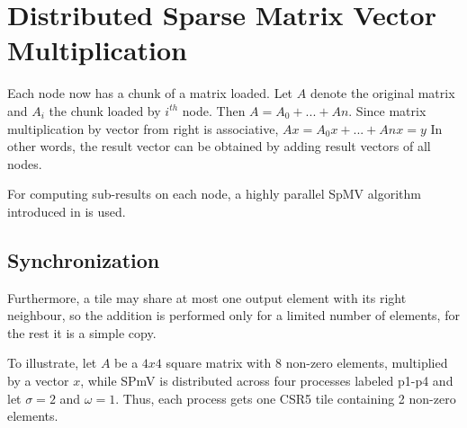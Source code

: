 \documentclass[thesis=M,english]{FITthesis}[2019/12/23]
\begin{document}
\chapter{Distributed Sparse Matrix Vector Multiplication}

Each node now has a chunk of a matrix loaded. Let $A$ denote the original matrix
and $A_{i}$ the chunk loaded by $i^{th}$ node. Then $A = A_{0} + ... + A{n}$. Since
matrix multiplication by vector from right is associative, $Ax = A_{0}x + ... + A{n}x = y$
In other words, the result vector can be obtained by adding result vectors of all nodes.

For computing sub-results on each node, a highly parallel SpMV algorithm introduced in
\cite{liu2015csr5} is used.

\section{Synchronization}

Furthermore, a tile may share at most one output element with its right neighbour, so
the addition is performed only for a limited number of elements, for the rest it is
a simple copy.


To illustrate, let $A$ be a $4x4$ square matrix with 8 non-zero elements, multiplied by a vector
$x$, while SPmV is distributed across four processes labeled p1-p4 and let $\sigma = 2$ and $\omega = 1$.
Thus, each process gets one CSR5 tile containing 2 non-zero elements.
\end{document}
